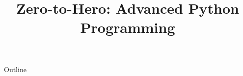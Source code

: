 \documentclass[xcolor=dvipsnames,compress,t,pdf]{beamer}
\title[\insertframenumber /\inserttotalframenumber]{Zero-to-Hero: Advanced Python Programming}
\begin{document}
	\begin{frame}
	\titlepage
	\end{frame}
	
	\begin{frame}{Outline}
	    \tableofcontents
	\end{frame}

	
	
	
\end{document}
